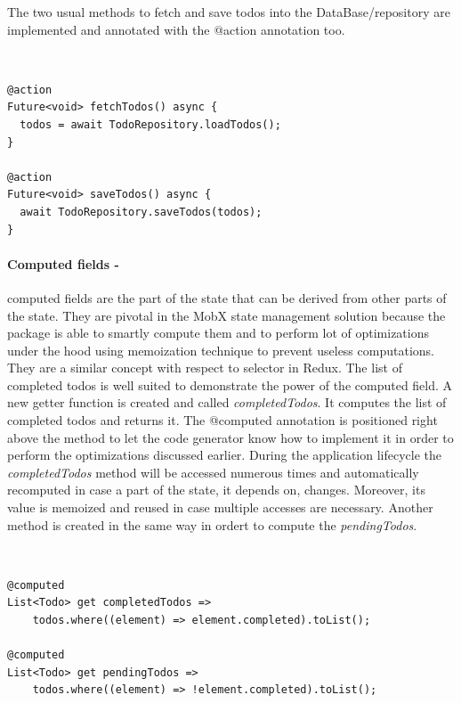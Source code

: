 The two usual methods to fetch and save todos into the DataBase/repository are implemented and annotated with the @action annotation too.
\begin{code}
\mbox{}\\
 \mbox{}
		\label{code:2.14}
\begin{verbatim}
@action
Future<void> fetchTodos() async {
  todos = await TodoRepository.loadTodos();
}

@action
Future<void> saveTodos() async {
  await TodoRepository.saveTodos(todos);
}
\end{verbatim}
\mbox{}
\end{code}

\paragraph{Computed fields - }
\label{subpar:todo_app_bloc_core_state}computed fields are the part of the state that can be derived from other parts of the state. They are pivotal in the MobX state management solution because the package is able to smartly compute them and to perform lot of optimizations under the hood using memoization technique to prevent useless computations. They are a similar concept with respect to selector in Redux. The list of completed todos is well suited to demonstrate the power of the computed field. A new getter function is created and called \textit{completedTodos}. It computes the list of completed todos and returns it. The @computed annotation is positioned right above the method to let the code generator know how to implement it in order to perform the optimizations discussed earlier. During the application lifecycle the \textit{completedTodos} method will be accessed numerous times and automatically recomputed in case a part of the state, it depends on, changes. Moreover, its value is memoized and reused in case multiple accesses are necessary. Another method is created in the same way in ordert to compute the \textit{pendingTodos}.
\begin{code}
\mbox{}\\
 \mbox{}
		\label{code:2.14}
\begin{verbatim}
@computed
List<Todo> get completedTodos =>
    todos.where((element) => element.completed).toList();

@computed
List<Todo> get pendingTodos =>
    todos.where((element) => !element.completed).toList();
\end{verbatim}
\mbox{}
\end{code}


